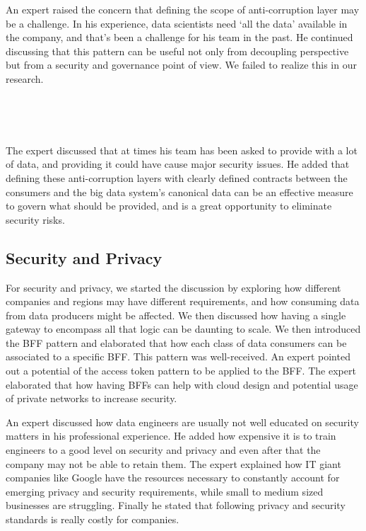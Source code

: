 \documentclass{bmcart}
\begin{document}
An expert raised the concern that defining the scope of anti-corruption layer may be a challenge. In his experience, data scientists need `all the data' available in the company, and that's been a challenge for his team in the past. He continued discussing that this pattern can be useful not only from decoupling perspective but from a security and governance point of view. We failed to realize this in our research. 

\,

\setlength{\fboxsep}{0.7em}
\noindent{}

\,

The expert discussed that at times his team has been asked to provide with a lot of data, and providing it could have cause major security issues. He added that defining these anti-corruption layers with clearly defined contracts between the consumers and the big data system's canonical data can be an effective measure to govern what should be provided, and is a great opportunity to eliminate security risks.  


\subsection{Security and Privacy}

For security and privacy, we started the discussion by exploring how different companies and regions may have different requirements, and how consuming data from data producers might be affected. We then discussed how having a single gateway to encompass all that logic can be daunting to scale. We then introduced the BFF pattern and elaborated that how each class of data consumers can be associated to a specific BFF. This pattern was well-received. An expert pointed out a potential of the access token pattern to be applied to the BFF. The expert elaborated that how having BFFs can help with cloud design and potential usage of private networks to increase security. 

An expert discussed how data engineers are usually not well educated on security matters in his professional experience. He added how expensive it is to train engineers to a good level on security and privacy and even after that the company may not be able to retain them. The expert explained how IT giant companies like Google have the resources necessary to constantly account for emerging privacy and security requirements, while small to medium sized businesses are struggling. Finally he stated that following privacy and security standards is really costly for companies.
\end{document}
